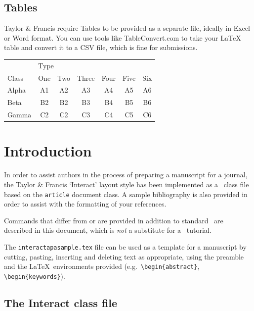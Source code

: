 \documentclass[]{interact}
\theoremstyle{plain}%
\theoremstyle{definition}
\theoremstyle{remark}
\begin{document}
\subsection{Tables}

Taylor \& Francis require Tables to be provided as a separate file, ideally in Excel or Word format. You can use tools like TableConvert.com to take your LaTeX table and convert it to a CSV file, which is fine for submissions. 

\begin{table}
{\begin{tabular}{lcccccc} \toprule
& \multicolumn{2}{l}{Type} \\ \cmidrule{2-7}
Class & One & Two & Three & Four & Five & Six \\ \midrule
Alpha & A1 & A2 & A3 & A4 & A5 & A6 \\
Beta & B2 & B2 & B3 & B4 & B5 & B6 \\
Gamma & C2 & C2 & C3 & C4 & C5 & C6 \\ \bottomrule
\end{tabular}}
\label{sample-table2}
\end{table}

\section{Introduction}

In order to assist authors in the process of preparing a manuscript for a journal, the Taylor \& Francis `\textsf{Interact}' layout style has been implemented as a \LaTeXe\ class file based on the \texttt{article} document class. A sample bibliography is also provided in order to assist with the formatting of your references.

Commands that differ from or are provided in addition to standard \LaTeXe\ are described in this document, which is \emph{not} a substitute for a \LaTeXe\ tutorial.

The \texttt{interactapasample.tex} file can be used as a template for a manuscript by cutting, pasting, inserting and deleting text as appropriate, using the preamble and the \LaTeX\ environments provided (e.g.\ \verb"\begin{abstract}", \verb"\begin{keywords}").

\subsection{The \textsf{Interact} class file}\label{class}
\end{document}
